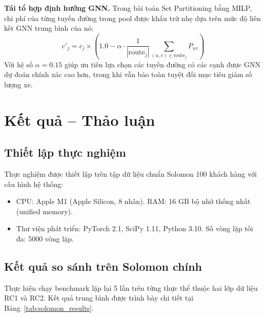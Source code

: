 \documentclass[13pt,a4paper]{extarticle}
\begin{document}
\textbf{Tái tổ hợp định hướng GNN.}
Trong bài toán Set Partitioning bằng MILP, chi phí của từng tuyến đường trong pool được khấu trừ nhẹ dựa trên mức độ liên kết GNN trung bình của nó:
\begin{equation}
  c'_j = c_j \times \left(1.0 - \alpha \cdot \frac{1}{|\text{route}_j|} \sum_{(u, v) \in \text{route}_j} P_{uv} \right)
\end{equation}
Với hệ số $\alpha = 0.15$ giúp ưu tiên lựa chọn các tuyến đường có các cạnh được GNN dự đoán chính xác cao hơn, trong khi vẫn bảo toàn tuyệt đối mục tiêu giảm số lượng xe.

\clearpage
\section{Kết quả -- Thảo luận}
\subsection{Thiết lập thực nghiệm}

Thực nghiệm được thiết lập trên tập dữ liệu chuẩn Solomon 100 khách hàng với cấu hình hệ thống:
\begin{itemize}[leftmargin=1.2cm]
  \item CPU: Apple M1 (Apple Silicon, 8 nhân). RAM: 16 GB bộ nhớ thống nhất (unified memory).
  \item Thư viện phát triển: PyTorch 2.1, SciPy 1.11, Python 3.10. Số vòng lặp tối đa: 5000 vòng lặp. 
\end{itemize}

\subsection{Kết quả so sánh trên Solomon chính}

Thực hiện chạy benchmark lặp lại 5 lần trên từng thực thể thuộc hai lớp dữ liệu RC1 và RC2. Kết quả trung bình được trình bày chi tiết tại Bảng~\ref{tab:solomon_results}.
\end{document}
